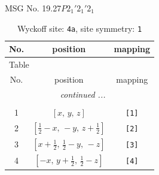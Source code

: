 \documentclass[fleqn,8pt]{jsarticle}
\begin{document}
\setcounter{MaxMatrixCols}{32}

\renewcommand{\tablename}{Table~}
\renewcommand{\figurename}{Figure~}
\begin{center}
\LARGE
MSG No. 19.27\quad$P2_{1}'2_{1}'2_{1}$
\end{center}
\renewcommand{\arraystretch}{1.2}
\begin{longtable}{ccc}
\caption{Wyckoff site: {\tt 4a}, site symmetry: {\tt 1}}
 \\
 \hline \hline
No. & position & mapping \\ \hline \endfirsthead

\multicolumn{2}{l}{\tablename\ \thetable{}} \\
 \hline \hline
No. & position & mapping \\ \hline \endhead

 \hline \hline
\multicolumn{2}{r}{\footnotesize\it continued ...} \\ \endfoot

 \hline \hline
\multicolumn{2}{r}{} \\ \endlastfoot

1 & $\left[ x,\, y,\, z \right]$ & {\tt [1]} \\ \hline
2 & $\left[ \frac{1}{2} - x,\, - y,\, z + \frac{1}{2} \right]$ & {\tt [2]} \\ \hline
3 & $\left[ x + \frac{1}{2},\, \frac{1}{2} - y,\, - z \right]$ & {\tt [3]} \\ \hline
4 & $\left[ - x,\, y + \frac{1}{2},\, \frac{1}{2} - z \right]$ & {\tt [4]} \\
\end{longtable}
\end{document}
